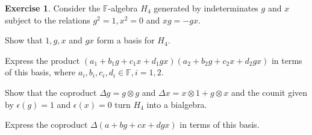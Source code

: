 \documentclass[svgnames]{article}
\theoremstyle{definition}
\newtheorem{Exercise}{Exercise}
\theoremstyle{remark}
\theoremstyle{underline}
\theoremstyle{underline}
\begin{document}
	\begin{Exercise}
		Consider the $\mathbb F$-algebra $H_4$ generated by indeterminates $g$ and $x$ subject to the relations $g^2 = 1, x^2 = 0$ and $xg = -gx$.
		\begin{subquests}
			\item Show that $1, g, x$ and $gx$ form a basis for $H_4$.
			\item Express the product $(a_1 + b_1 g + c_1 x + d_1 gx)(a_2 + b_2 g + c_2 x + d_2 gx)$ in terms of this basis, where $a_i, b_i, c_i, d_i \in \mathbb F, i = 1, 2$.
			\item Show that the coproduct $\Delta g = g \otimes g$ and $\Delta x = x \otimes 1 + g \otimes x$ and the counit given by $\epsilon(g) = 1$ and $\epsilon(x) = 0$ turn $H_4$ into a bialgebra.
			\item Express the coproduct $\Delta(a + bg + cx + dgx)$ in terms of this basis.
		\end{subquests}
	\end{Exercise}
\end{document}
